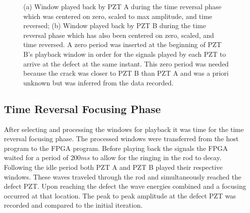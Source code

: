 \begin{figure}
\begin{subfigmatrix}{2}
\end{subfigmatrix}

  \caption
  { \label{fig:scaledSignals}
(a) Window played back by PZT A during the time reversal phase which was centered on zero, scaled to max amplitude, and time reversed;
(b) Window played back by PZT B during the time reversal phase which has also been centered on zero, scaled, and time reversed. A zero period was inserted at the beginning of PZT B's playback window in order for the signals played by each PZT to arrive at the defect at the same instant. This zero period was needed because the crack was closer to PZT B than PZT A and was a priori unknown but was inferred from the data recorded.
}
\end{figure}

\subsection{Time Reversal Focusing Phase}
After selecting and processing the windows for playback it was time for the time reversal focusing phase. The processed windows were transferred from the host program to the FPGA program. Before playing back the signals the FPGA waited for a period of $200ms$ to allow for the ringing in the rod to decay. Following the idle period both PZT A and PZT B played their respective windows. These waves traveled through the rod and simultaneously reached the defect PZT. Upon reaching the defect the wave energies combined and a focusing occurred at that location. The peak to peak amplitude at the defect PZT was recorded and compared to the initial iteration.

